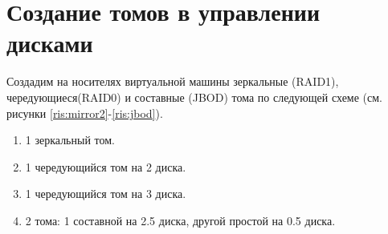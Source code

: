 \documentclass[a4paper,14pt]{extarticle}
\begin{document}
\section{Создание томов в управлении дисками }
Создадим на носителях виртуальной машины зеркальные (RAID1), чередующиеся(RAID0) и составные (JBOD) тома по следующей схеме (см. рисунки \ref{ris:mirror2}-\ref{ris:jbod}).
\begin{enumerate}

\item 1 зеркальный том.
\item 1 чередующийся том на 2 диска.
\item  1 чередующийся том на 3 диска.
\item 2 тома: 1 составной на 2.5 диска, другой простой на 0.5 диска.
\end{enumerate}
\end{document}
